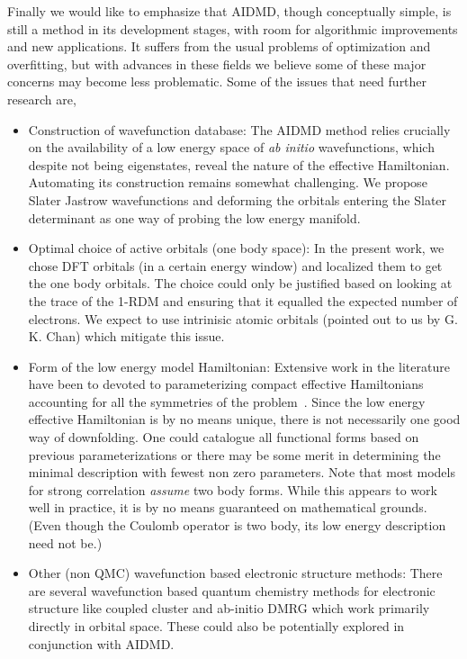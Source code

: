 \documentclass[prl,12pt,onecolumn,nofootinbib,notitlepage,english,superscriptaddress]{revtex4-1}
\begin{document}
Finally we would like to emphasize that AIDMD, though conceptually simple, 
is still a method in its development stages, with room for algorithmic improvements and new applications. It suffers 
from the usual problems of optimization and overfitting, but with advances in these fields we believe some of these major 
concerns may become less problematic. Some of the issues that need further research are,
\begin{itemize} 
	\item Construction of wavefunction database:
	The AIDMD method relies crucially on the availability of a low energy space of \emph{ab initio} wavefunctions, 
	which despite not being eigenstates, reveal the nature of the effective Hamiltonian. Automating its construction 
	remains somewhat challenging. We propose Slater Jastrow wavefunctions and deforming the orbitals entering the Slater 
	determinant as one way of probing the low energy manifold.
	\item Optimal choice of active orbitals (one body space):
	In the present work, we chose DFT orbitals (in a certain energy window) and localized them to get the one body orbitals. 
	The choice could only be justified based on looking at the trace of the 1-RDM and ensuring that it 
	equalled the expected number of electrons. We expect to use intrinisic atomic orbitals (pointed out to us by G. K. Chan) which 
	mitigate this issue. 
	\item Form of the low energy model Hamiltonian:
	Extensive work in the literature have been to devoted to parameterizing compact effective Hamiltonians accounting for all 
	the symmetries of the problem~\cite{Georges, Hubbard, Kanamori, Oles, Coury}. 
	Since the low energy effective Hamiltonian is by no means unique, there is not necessarily one good way of downfolding. 
	One could catalogue all functional forms based on previous parameterizations 
	or there may be some merit in determining the minimal description with fewest non zero parameters.
	Note that most models for strong correlation \emph{assume} two body forms. While this appears to work well in practice, 
	it is by no means guaranteed on mathematical grounds. (Even though the Coulomb operator is two body, 
	its low energy description need not be.)
	\item Other (non QMC) wavefunction based electronic structure methods:
	There are several wavefunction based quantum chemistry 
	methods for electronic structure like coupled cluster and ab-initio DMRG which work primarily 
	directly in orbital space. These could also be potentially explored in conjunction with AIDMD.
	
\end{itemize} 
\end{document}
